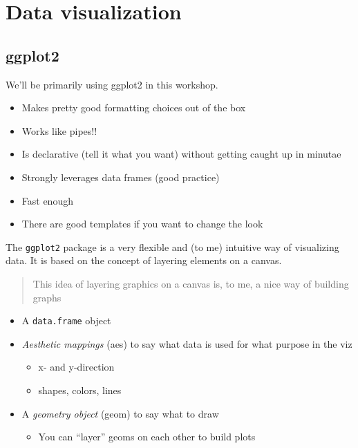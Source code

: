\documentclass[12pt,letterpaperpaper,openany]{book}
\providecommand{\tightlist}{%
  \setlength{\itemsep}{0pt}\setlength{\parskip}{0pt}}
\begin{document}
\hypertarget{graphics}{%
\chapter{Data visualization}\label{graphics}}

\hypertarget{ggplot2}{%
\section{ggplot2}\label{ggplot2}}

We'll be primarily using ggplot2 in this workshop.

\begin{itemize}
\tightlist
\item
  Makes pretty good formatting choices out of the box
\item
  Works like pipes!!
\item
  Is declarative (tell it what you want) without getting caught up in minutae
\item
  Strongly leverages data frames (good practice)
\item
  Fast enough
\item
  There are good templates if you want to change the look
\end{itemize}

The \texttt{ggplot2} package is a very flexible and (to me) intuitive way of visualizing data.
It is based on the concept of layering elements on a canvas.

\begin{quote}
This idea of layering graphics on a canvas is, to me, a nice way of building graphs
\end{quote}

\begin{itemize}
\tightlist
\item
  A \texttt{data.frame} object
\item
  \emph{Aesthetic mappings} (aes) to say what data is used for what purpose in the viz

  \begin{itemize}
  \tightlist
  \item
    x- and y-direction
  \item
    shapes, colors, lines
  \end{itemize}
\item
  A \emph{geometry object} (geom) to say what to draw

  \begin{itemize}
  \tightlist
  \item
    You can ``layer'' geoms on each other to build plots
  \end{itemize}
\end{itemize}
\end{document}
